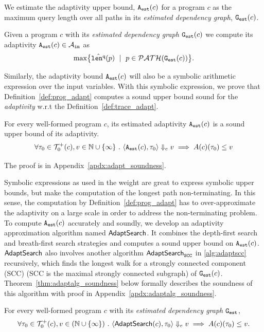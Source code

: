  We estimate the adaptivity upper bound, ${\mathtt{A_{est}}}(c)$ for a program $c$ as the maximum query length over all paths in its \emph{estimated dependency graph}, $\mathtt{{G_{est}}}({c})$. 
\begin{defn}
\label{def:prog_adapt}
{
Given a program ${c}$ with its \emph{estimated dependency graph} 
$\mathtt{{G_{est}}}({c})$ we compute its adaptivity ${\mathtt{A_{est}}}({c}) \in \mathcal{A}_{\mathtt{in}}$ as
%
\[
 \max \left\{ \hat{\qlen}(p) \ \mid \  p \in \paths(\progG(c))\right \}.
\]
}
\end{defn}
Similarly, the adaptivity bound ${\mathtt{A_{est}}}(c)$ will also be a symbolic arithmetic expression over the input variables. 
With this symbolic expression, we prove that Definition~\ref{def:prog_adapt} computes
a sound upper bound sound for the \emph{adaptivity} w.r.t the Definition~\ref{def:trace_adapt}.
\begin{thm}
 \label{thm:adaptfun_sound}
 For every well-formed program $c$, 
 its estimated adaptivity ${\mathtt{A_{est}}}({c})$ is a sound upper bound of its adaptivity.
 \[
 \forall \mathtt{\tau}_0 \in \mathcal{T}^{+}_{0}(c), v \in \mathbb{N} \cup \{\infty\} ~.~
 \langle {\ensuremath{\mathtt{A_{est}}}}(c), \mathtt{\tau}_0 \rangle \Downarrow_e v \implies A(c)(\mathtt{\tau}_0) \leq v
\] 
\end{thm}
The proof is in Appendix~\ref{apdx:adapt_soundness}.


Symbolic expressions as used in the weight are great to express symbolic upper bounds, but make the computation of 
the longest path non-terminating. 
In this sense, the computation by Definition~\ref{def:prog_adapt} has to
over-approximate the adaptivity on a large scale in order to address the non-terminating problem.
To compute ${\mathtt{A_{est}}}(c)$ accurately and soundly, we develop an adaptivity approximation algorithm named $\mathsf{AdaptSearch}$.
It combines the depth-first search and breath-first search strategies and computes a sound upper bound on ${\mathtt{A_{est}}}(c)$.
$\mathsf{AdaptSearch}$ also involves another algorithm $\mathsf{AdaptSearch}_{\mathtt{SCC}}$ in \ref{alg:adaptscc} recursively, which finds the longest walk for a strongly connected component (SCC) (SCC is the maximal strongly connected subgraph) of $\mathtt{{G_{est}}}(c)$.
Theorem~\ref{thm:adaptalg_soundness} below formally describes the soundness of this algorithm with proof in Appendix~\ref{apdx:adaptalg_soundness}.
\begin{thm}
 \label{thm:adaptalg_soundness}
 For every well-formed program $c$ with its \emph{estimated dependency graph} $\mathtt{{G_{est}}}$,
 \[ 
 \forall \mathtt{\tau}_0 \in \mathcal{T}^{+}_{0}(c), v \in (\mathbb{N}\cup \{\infty\}) ~.~
 \langle \mathsf{AdaptSearch}(c), \mathtt{\tau}_0 \rangle \Downarrow_e v \implies A(c)(\mathtt{\tau}_0) \leq v.
 \]
\end{thm}

